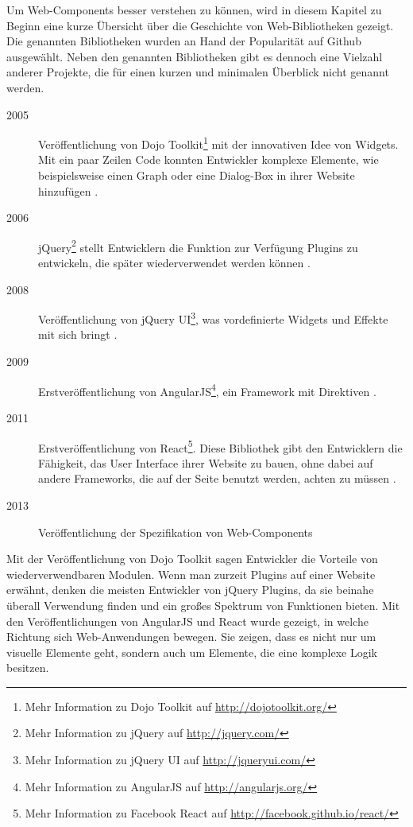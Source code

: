 Um Web-Components besser verstehen zu können, wird in diesem Kapitel zu Beginn eine kurze Übersicht über die Geschichte von Web-Bibliotheken gezeigt. Die genannten Bibliotheken wurden an Hand der Popularität auf Github ausgewählt. Neben den genannten Bibliotheken gibt es dennoch eine Vielzahl anderer Projekte, die für einen kurzen und minimalen Überblick nicht genannt werden.

\begin{description}
\item[2005] Veröffentlichung von Dojo Toolkit\footnote{Mehr Information zu Dojo Toolkit auf \href{http://dojotoolkit.org/}{http://dojotoolkit.org/}} mit der innovativen Idee von Widgets. Mit ein paar Zeilen Code konnten Entwickler komplexe Elemente, wie beispielsweise einen Graph oder eine Dialog-Box in ihrer Website hinzufügen \citereset \autocite{Dojo}.
\item[2006] jQuery\footnote{Mehr Information zu jQuery auf \href{http://jquery.com/}{http://jquery.com/}} stellt Entwicklern die Funktion zur Verfügung Plugins zu entwickeln, die später wiederverwendet werden können \citereset \autocite{jQuery}.
\item[2008] Veröffentlichung von jQuery UI\footnote{Mehr Information zu jQuery UI auf \href{http://jqueryui.com/}{http://jqueryui.com/}}, was vordefinierte Widgets und Effekte mit sich bringt \citereset \autocite{jQueryUI}.
\item[2009] Erstveröffentlichung von AngularJS\footnote{Mehr Information zu AngularJS auf \href{http://angularjs.org/}{http://angularjs.org/}}, ein Framework mit Direktiven \citereset \autocite{AngularJS}.
\item[2011] Erstveröffentlichung von React\footnote{Mehr Information zu Facebook React auf \href{http://facebook.github.io/react/}{http://facebook.github.io/react/}}. Diese Bibliothek gibt den Entwicklern die Fähigkeit, das User Interface ihrer Website zu bauen, ohne dabei auf andere Frameworks, die auf der Seite benutzt werden, achten zu müssen \citereset \autocite{Facebook}.
\item[2013] Veröffentlichung der Spezifikation von Web-Components
\end{description}

Mit der Veröffentlichung von Dojo Toolkit sagen Entwickler die Vorteile von wiederverwendbaren Modulen. Wenn man zurzeit Plugins auf einer Website erwähnt, denken die meisten Entwickler von jQuery Plugins, da sie beinahe überall Verwendung finden und ein großes Spektrum von Funktionen bieten. Mit den Veröffentlichungen von AngularJS und React wurde gezeigt, in welche Richtung sich Web-Anwendungen bewegen. Sie zeigen, dass es nicht nur um visuelle Elemente geht, sondern auch um Elemente, die eine komplexe Logik besitzen.





